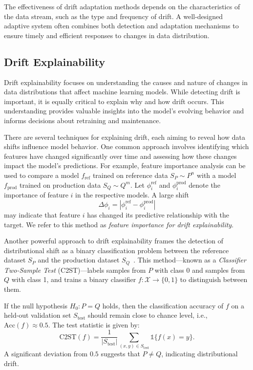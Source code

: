 The effectiveness of drift adaptation methods depends on the characteristics of
the data stream, such as the type and frequency of drift. A well-designed
adaptive system often combines both detection and adaptation mechanisms to
ensure timely and efficient responses to changes in data distribution.

\subsection*{Drift Explainability}\label{subsec:drift_explainability}

Drift explainability focuses on understanding the causes and nature of changes
in data distributions that affect machine learning models. While detecting
drift is important, it is equally critical to explain why and how drift occurs.
This understanding provides valuable insights into the model's evolving
behavior and informs decisions about retraining and maintenance.

There are several techniques for explaining drift, each aiming to reveal how
data shifts influence model behavior. One common approach involves identifying
which features have changed significantly over time and assessing how these
changes impact the model's predictions. For example, feature importance
analysis can be used to compare a model $f_{\text{ref}}$ trained on reference
data $S_P \sim P^n$ with a model $f_{\text{prod}}$ trained on production data
$S_Q \sim Q^m$. Let $\phi_i^{\text{ref}}$ and $\phi_i^{\text{prod}}$ denote the
importance of feature $i$ in the respective models. A large shift
\begin{equation}
    \Delta \phi_i = \left| \phi_i^{\text{ref}} - \phi_i^{\text{prod}} \right|
\end{equation}
may indicate that feature $i$ has changed its predictive relationship with the target.
We refer to this method as \emph{feature importance for drift explainability}.

Another powerful approach to drift explainability frames the detection of
distributional shift as a binary classification problem between the reference
dataset $S_P$ and the production dataset
$S_Q$~\cite{revisiting_two_sample_classifier}. This method—known as a
\emph{Classifier Two-Sample Test} (C2ST)—labels samples from $P$ with class 0
and samples from $Q$ with class 1, and trains a binary classifier $f:
    \mathcal{X} \rightarrow \{0, 1\}$ to distinguish between them.

If the null hypothesis $H_0: P = Q$ holds, then the classification accuracy of
$f$ on a held-out validation set $S_{\text{test}}$ should remain close to
chance level, i.e., $\text{Acc}(f) \approx 0.5$. The test statistic is given
by:
\begin{equation}
    \text{C2ST}(f) = \frac{1}{|S_{\text{test}}|} \sum_{(x, y) \in S_{\text{test}}} \mathbb{1}\{f(x) = y\}.
\end{equation}
A significant deviation from $0.5$ suggests that $P \neq Q$, indicating distributional drift.

